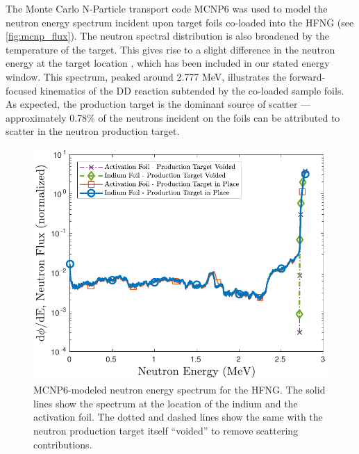 
The Monte Carlo N-Particle transport code  MCNP6 \cite{goorley2013initial} was used to model the neutron energy spectrum incident upon target foils co-loaded into the HFNG (see \autoref{fig:mcnp_flux}).
The neutron spectral distribution is also broadened by the temperature of the target.  
This gives rise to a slight difference in the neutron energy at the target location \cite{Waltz2016a}, which has been included in our stated energy window.
This spectrum, peaked around 2.777 MeV, illustrates the forward-focused kinematics of the DD reaction subtended by the co-loaded sample foils.
 As expected, the  production target is the dominant source of scatter --- approximately 0.78\%  of the neutrons incident on the foils can be attributed to scatter in the neutron production target.  
 




\begin{figure}
 \centering
 \includegraphics[scale=0.6]{./figures/mcnp_flux_new.pdf}
 \caption{MCNP6-modeled neutron energy spectrum for the HFNG.  The solid lines show the spectrum at the location of the indium and the activation foil. The dotted and dashed lines show the same with the neutron production target itself \enquote{voided} to remove scattering contributions.  }
 \label{fig:mcnp_flux}
\end{figure}




